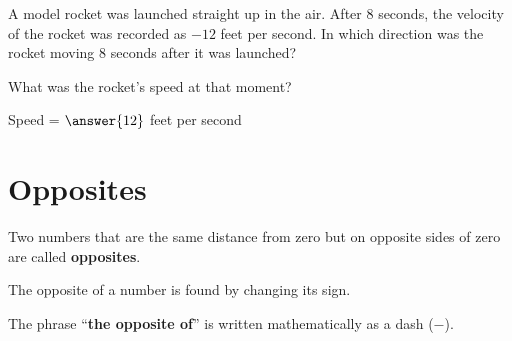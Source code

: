 \documentclass{ximera}[font=12pt]
\begin{document}
\begin{problem}
A model rocket was launched straight up in the air.  After $8$ seconds, the velocity of the rocket was recorded as $-12$ feet per second.
In which direction was the rocket moving $8$ seconds after it was launched?

\begin{multipleChoice}
\end{multipleChoice}

What was the rocket's speed at that moment?

Speed = $\answer{12}$ feet per second

\end{problem}

\section*{Opposites}

\begin{definition}

Two numbers that are the same distance from zero but on opposite sides
of zero are called \textbf{opposites}.

The opposite of a number is found by changing its sign.

The phrase ``\textbf{the opposite of}'' is written mathematically as a dash ($-$).

\end{definition}
\end{document}

